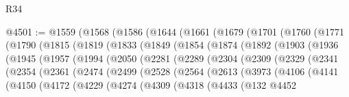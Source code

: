 \begin{lexlean}{R34}
\begin{coremodule}
@4501 := @1559
    (@1568
      (@1586
        (@1644
          (@1661
            (@1679
              (@1701
                (@1760
                  (@1771
                    (@1790
                      (@1815
                        (@1819
                          (@1833
                            (@1849
                              (@1854
                                (@1874
                                  (@1892
                                    (@1903
                                      (@1936
                                        (@1945
                                          (@1957
                                            (@1994
                                              (@2050
                                                (@2281
                                                  (@2289
                                                    (@2304
                                                      (@2309
                                                        (@2329
                                                          (@2341
                                                            (@2354
                                                              (@2361
                                                                (@2474
                                                                  (@2499
                                                                    (@2528
                                                                      (@2564
                                                                        (@2613
                                                                          (@3973
                                                                            (@4106
                                                                              (@4141
                                                                                (@4150
                                                                                  (@4172
                                                                                    (@4229
                                                                                      (@4274
                                                                                        (@4309
                                                                                          (@4318
                                                                                            (@4433
                                                                                              (@132
                                                                                                @4452

\end{coremodule}
\end{lexlean}

